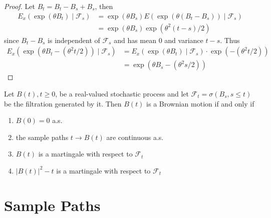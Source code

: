\begin{proof}
    Let $B_{t}=B_{t}-B_{s}+B_{s}$, then
    \begin{equation*}
        \begin{aligned}
            E_{x}\left(\exp\left(\theta B_{t}\right)\mid\mathcal{F}_{s}\right) & =\exp \left(\theta B_{s}\right)E\left(\exp\left(\theta\left(B_{t}-B_{s}\right)\right)\mid\mathcal{F}_{s}\right) \\
                                                                               & =\exp\left(\theta B_{s}\right)\exp\left(\theta^{2}(t-s)/2\right)
        \end{aligned}
    \end{equation*}
    since $B_{t}-B_{s}$ is independent of $\mathcal{F}_{s}$ and has mean 0 and variance $t-s$. Thus
    \begin{equation*}
        \begin{aligned}
            E_{x}\left(\exp\left(\theta B_{t}-\left(\theta^{2}t/2\right)\right)\mid\mathcal{F}_{s}\right) & =E_{x}\left(\exp\left(\theta B_{t}\right)\mid\mathcal{F}_{s}\right)\cdot\exp\left(-\left(\theta^{2}t/2\right)\right) \\
                                                                                                          & =\exp\left(\theta B_{s}-\left(\theta^{2}s/2\right)\right)
        \end{aligned}
    \end{equation*}
\end{proof}

\begin{theorem}
    Let $B(t),t\geq 0$, be a real-valued stochastic process and let $\mathcal{F}_{t}=\sigma\left(B_{s},s\leq t\right)$ be the filtration generated by it. Then $B(t)$ is a Brownian motion if and only if
    \begin{enumerate}
        \item $B(0)=0$ a.s.
        \item the sample paths $t\rightarrow B(t)$ are continuous a.s.
        \item $B(t)$ is a martingale with respect to $\mathcal{F}_{t}$
        \item $|B(t)|^{2}-t$ is a martingale with respect to $\mathcal{F}_{t}$
    \end{enumerate}
\end{theorem}

\section{Sample Paths}

